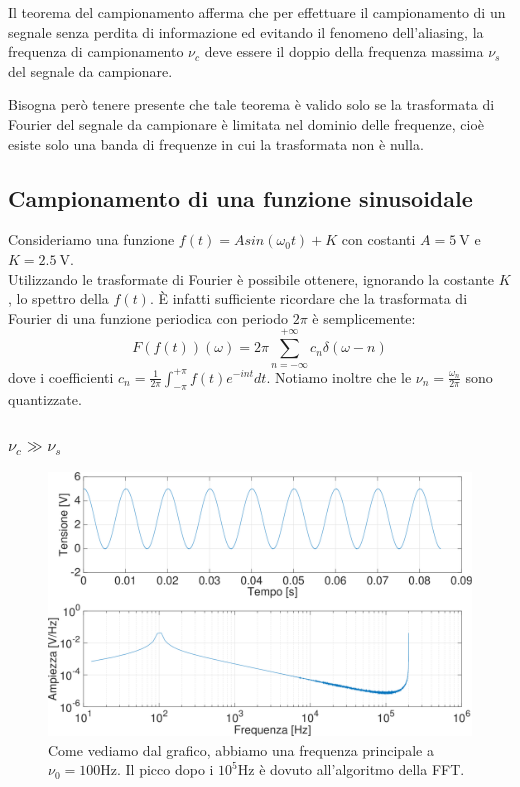 Il teorema del campionamento afferma che per effettuare il campionamento di un segnale senza perdita di informazione ed evitando il fenomeno dell'aliasing, la frequenza di campionamento $\nu_c$ deve essere il doppio della frequenza massima $\nu_s$ del segnale da campionare.

Bisogna però tenere presente che tale teorema è valido solo se la trasformata di Fourier del segnale da campionare è limitata nel dominio delle frequenze, cioè esiste solo una banda di frequenze in cui la trasformata non è nulla.

\subsection{Campionamento di una funzione sinusoidale}

Consideriamo una funzione $f(t)=Asin(\omega_0 t)+K$ con costanti $A=\SI{5}{\V}$ e $K=\SI{2.5}{\V}$.\\
Utilizzando le trasformate di Fourier è possibile ottenere, ignorando la costante $K$, lo spettro della $f(t)$.
È infatti sufficiente ricordare che la trasformata di Fourier di una funzione periodica con periodo $2\pi$ è semplicemente:
$$F(f(t))(\omega)=2\pi \sum_{n=-\infty}^{+\infty} c_n \delta(\omega-n ) $$
dove i coefficienti $c_n=\frac{1}{2\pi}\int_{-\pi}^{+\pi} f(t)e^{-int}dt$.
Notiamo inoltre che le $\nu_n=\frac{\omega_n}{2\pi}$ sono quantizzate.

\subsubsection{$\nu_c \gg \nu_s$}

\begin{figure}[H]
\centering
	\includegraphics[width=.65\textwidth]{../E13/latex/sin100hz@17000,200000_crop.pdf}
	\caption{Come vediamo dal grafico, abbiamo una frequenza principale a $\nu_0=100 \si{\hertz}$. Il picco dopo i $10^5\si{\hertz}$ è dovuto all'algoritmo della FFT.}
	\label{sin1}
\end{figure}

